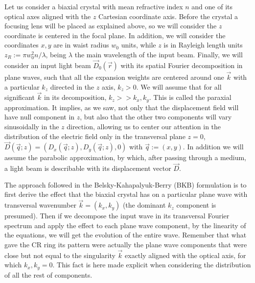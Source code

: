 \documentclass[11pt, a4paper, twoside]{article} %
\begin{document}
Let us consider a biaxial crystal with mean refractive index $n$ and one of its optical axes aligned with the $z$ Cartesian coordinate axis. Before the crystal a focusing lens will be placed as explained above, so we will consider the $z$ coordinate is centered in the focal plane. In addition, we will consider the coordinates $x,y$ are in waist radius $w_0$ units, while $z$ is in Rayleigh length units $z_R:=\pi w_0^2n/\lambda$, being $\lambda$ the main wavelength of the input beam. Finally, we will consider an input light beam $\vec{D}_0(\vec{r})$ with its spatial Fourier decomposition in plane waves, such that all the expansion weights are centered around one $\vec{k}$ with a particular $k_z$ directed in the $z$ axis, $k_z>0$. We will assume that for all significant $\vec{k}$ in its decomposition, $k_z>>k_x,k_y$. This is called the paraxial approximation. It implies, as we saw, not only that the displacement field will have null component in $z$, but also that the other two components will vary sinusoidally in the $z$ direction, allowing us to center our attention in the distribution of the electric field only in the transversal plane $z=0$, $\vec{D}(\vec{q};z)=(D_x(\vec{q};z),D_y(\vec{q};z), 0)$ with $\vec{q}:=(x,y)$. In addition we will assume the parabolic approximation, by which, after passing through a medium, a light beam is describable with its displacement vector $\vec{D}$.

The approach followed in the Belsky-Kahapalyuk-Berry (BKB) formulation is to first derive the effect that the biaxial crystal has on a particular plane wave with transversal wavenumber $\vec{k}=(k_x,k_y)$ (the dominant $k_z$ component is presumed). Then if we decompose the input wave in its transversal Fourier spectrum and apply the effect to each plane wave component, by the linearity of the equations, we will get the evolution of the entire wave. Remember that what gave the CR ring its pattern were actually the plane wave components that were close but not equal to the singularity $\vec{k}$ exactly aligned with the optical axis, for which $k_x,k_y=0$. This fact is here made explicit when considering the distribution of all the rest of components.
\end{document}
